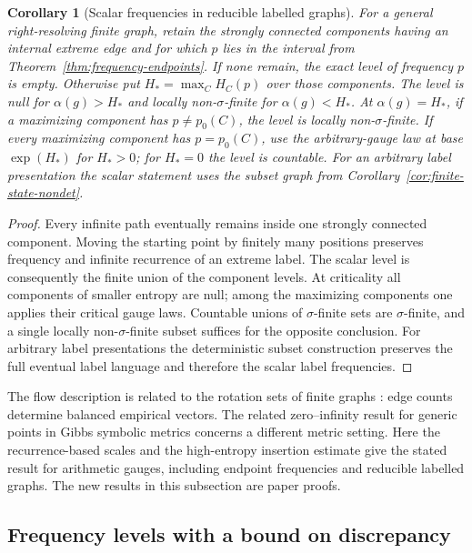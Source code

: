\documentclass[11pt]{article}
\newtheorem{corollary}[theorem]{Corollary}
\theoremstyle{definition}
\theoremstyle{remark}
\begin{document}
\begin{corollary}[Scalar frequencies in reducible labelled graphs]
\label{cor:reducible-frequency-rates}
For a general right-resolving finite graph, retain the strongly
connected components having an internal extreme edge and for
which $p$ lies in the interval from
Theorem~\ref{thm:frequency-endpoints}. If none remain, the
exact level of frequency $p$ is empty. Otherwise put
$H_*=\max_C H_C(p)$ over those components.
The level is null for $\alpha(g)>H_*$ and locally
non-$\sigma$-finite for $\alpha(g)<H_*$. At $\alpha(g)=H_*$,
if a maximizing component has $p\ne p_0(C)$, the level is
locally non-$\sigma$-finite. If every maximizing component
has $p=p_0(C)$, use the arbitrary-gauge law at base
$\exp(H_*)$ for $H_*>0$; for $H_*=0$ the level is countable.
For an arbitrary label presentation the scalar statement uses
the subset graph from Corollary~\ref{cor:finite-state-nondet}.
\end{corollary}
\begin{proof}
Every infinite path eventually remains inside one strongly
connected component. Moving the starting point by finitely many
positions preserves frequency and infinite recurrence of an
extreme label. The scalar level is consequently the finite
union of the component levels. At criticality all components
of smaller entropy are null; among the maximizing components
one applies their critical gauge laws. Countable unions of
$\sigma$-finite sets are $\sigma$-finite, and a single locally
non-$\sigma$-finite subset suffices for the opposite conclusion.
For arbitrary label presentations the deterministic subset
construction preserves the full eventual label language and
therefore the scalar label frequencies.
\end{proof}

The flow description is related to the rotation sets of finite
graphs \cite{ZiemianRotation}: edge counts determine balanced empirical vectors.
The related zero--infinity result for generic points in Gibbs
symbolic metrics \cite{GenericZeroInfinity} concerns a different
metric setting. Here the recurrence-based scales and the
high-entropy insertion estimate give the stated result for
arithmetic gauges, including endpoint frequencies and reducible
labelled graphs. The new results in this subsection are paper proofs.


\subsection{Frequency levels with a bound on discrepancy}
\end{document}
